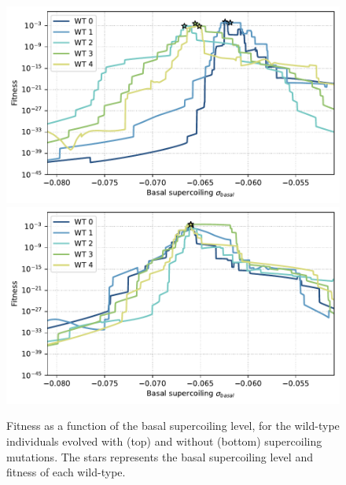 \begin{figure}
\centering
\includegraphics[width=\textwidth]{epistasis/img/with-sc/fitness_landscapes_wt.pdf}
\includegraphics[width=\textwidth]{epistasis/img/control/fitness_landscapes_wt.pdf}
\caption[Supercoiling fitness landscapes for the wild-type individuals evolved with and without supercoiling mutations]{Fitness as a function of the basal supercoiling level, for the wild-type individuals evolved with (top) and without (bottom) supercoiling mutations.
The stars represents the basal supercoiling level and fitness of each wild-type.}
\label{fig:epistasis:fitness-landscapes-wt}
\end{figure}

